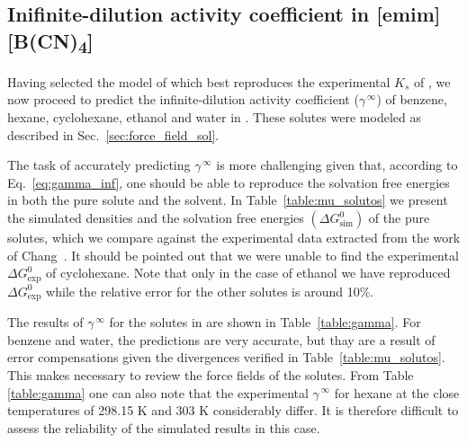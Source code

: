 \documentclass[3p,twocolumn]{elsarticle}
\begin{document}
\subsection{Inifinite-dilution activity coefficient in [emim] [B(CN)\textsubscript{4}]}
\label{sec:act_results}

Having selected the model of \ce{[emim][B(CN)_4]} which best reproduces the experimental $K_s$ of , we now proceed to predict the infinite-dilution activity coefficient ($\gamma^{\, \infty}$) of benzene, hexane, cyclohexane, ethanol and water in \ce{[emim][B(CN)_4]}. These solutes were modeled as described in Sec.~\ref{sec:force_field_sol}.

The task of accurately predicting $\gamma^{\, \infty}$ is more challenging given that, according to Eq.~\ref{eq:gamma_inf}, one should be able to reproduce the solvation free energies in both the pure solute and the solvent. In Table~\ref{table:mu_solutos} we present the simulated densities and the solvation free energies  $(\Delta G^{0}_{\text{sim}})$ of the pure solutes, which we compare against the experimental data extracted from the work of Chang~\cite{Chang_2009}. It should be pointed out that we were unable to find the experimental $\Delta G^{0}_\text{exp}$ of cyclohexane. Note that only in the case of ethanol we have reproduced $\Delta G^{0}_\text{exp}$ while the relative error for the other solutes is around 10\%.

The results of $\gamma^{\, \infty}$ for the solutes in \ce{[emim][B(CN)_4]} are shown in Table~\ref{table:gamma}. For benzene and water, the predictions are very accurate, but thay are a result of error compensations given the divergences verified in Table~\ref{table:mu_solutos}. This makes necessary to review the force fields of the solutes. From Table \ref{table:gamma} one can also note that the experimental $\gamma^{\, \infty}$ for hexane at the close temperatures of 298.15 K and 303 K considerably differ. It is therefore difficult to assess the reliability of the simulated results in this case.
\end{document}
